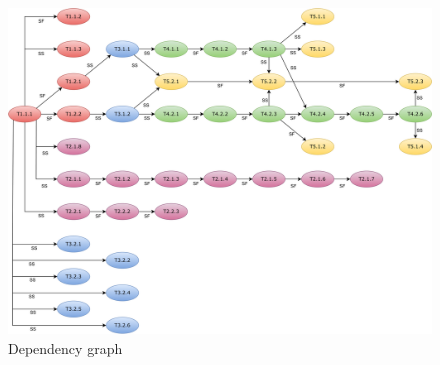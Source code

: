 \begin{figure}[h]
\centering
\includegraphics[width=\textwidth]{images/dependency-graph.pdf}
\caption{Dependency graph}
\label{fig:dependency-graph}
\end{figure}
